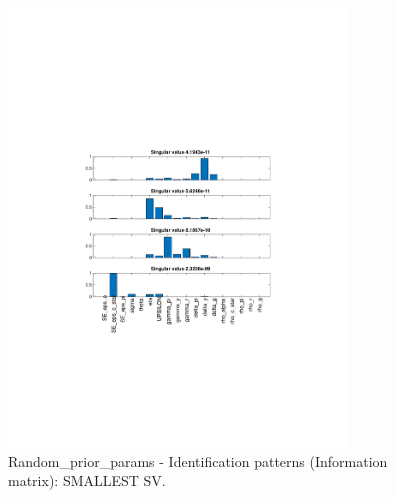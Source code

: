 
\begin{figure}[H]
\centering 
\includegraphics[width=0.8\textwidth]{fiscal/identification/fiscal_ident_pattern_Random_prior_params_1}
\caption{Random_prior_params - Identification patterns (Information matrix): SMALLEST SV.}\label{Fig:ident_pattern:Random_prior_params:1}
\end{figure}

